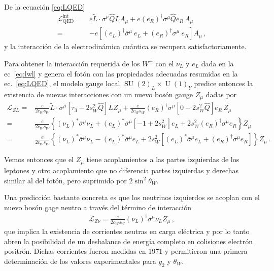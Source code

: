 \begin{frame}
De  la ecuación \eqref{eq:LQED}
\begin{align}
     \mathcal{L}^{\text{int}}_{\text{QED}}=&e \widetilde{L}\cdot\overline{\sigma}^\mu \widehat{Q} L A_\mu+
e \left( e_R \right)^{\dagger}{\sigma}^\mu \widehat{Q} e_R\, A_\mu \nonumber\\
=&-e \left[ \left( e_L \right)^{\dagger}\overline{\sigma}^\mu \ e_L + \left( e_R \right)^{\dagger}{\sigma}^\mu \ e_R  \right]A_{\mu}\,,
\end{align}
y la interacción de la electrodinámica cuántica se recupera satisfactoriamente.
\end{frame}

\begin{frame}
Para obtener la interacción requerida de los $W^{\pm}$ con el $\nu_L$ y $e_L$ dada en la ec~\eqref{eq:lwl} y genera el fotón con las propiedades adecuadas resumidas en la ec.~\eqref{eq:LQED}, el modelo gauge local $\operatorname{SU}(2)_L\times \operatorname{U}(1)_Y$ predice entonces la existencia de nuevas interacciones con un nuevo bosón gauge $Z_{\mu}$ dadas por
\begin{align}
  \label{eq:zneus}
\mathcal{L}_{ZL}
=&\frac{e}{2c_W s_W} \widetilde{L}\cdot\overline{\sigma}^\mu\left[ \tau_3-2s_W^2\widehat{Q}\right]L Z_\mu
+\frac{e}{2c_W s_W} \left( e_R \right)^{\dagger}{\sigma}^\mu\left[ 0-2s_W^2\widehat{Q}\right]e_R\, Z_\mu \nonumber\\
  =&\frac{e}{2c_W s_W} \left\{ \left( \nu_L \right)^{*}\overline{\sigma}^\mu \nu_L
    + \left( e_L \right)^{*}\overline{\sigma}^\mu\left[ -1+2s_W^2\right]e_L
     +2s_W^2 \left( e_R \right)^{\dagger}{\sigma}^\mu e_R 
     \right\}Z_\mu \nonumber\\
 =&\frac{e}{2c_W s_W} \left\{ \left( \nu_L \right)^{*}\overline{\sigma}^\mu \nu_L
    - \left( e_L \right)^{*}\overline{\sigma}^\mu e_L 
    +2s_W^2 \left[\left( e_L \right)^{*}\overline{\sigma}^\mu e_L+
    \left( e_R \right)^{\dagger}{\sigma}^\mu e_R    \right]  
     \right\}Z_\mu\,.     
\end{align}
\end{frame}
Vemos entonces que el $Z_{\mu}$ tiene acoplamientos a las partes izquierdas
de los leptones y otro acoplamiento que no diferencia partes izquierdas y derechas similar al del fotón, pero
suprimido por $2\sin^2\theta_W$.


Una predicción bastante concreta es que los neutrinos izquierdos se acoplan con el nuevo bosón gage neutro a través del término de interacción
\begin{align}
\mathcal{L}_{Z\nu}=  \frac{e}{2c_W s_W}\left( \nu_L \right)^{\dagger} \overline{\sigma}^{\mu} \nu_L Z_\mu\,,
\end{align}
que implica la existencia de corrientes neutras en carga eléctrica y por lo tanto abren la posibilidad de un desbalance de energía completo en colisiones electrón positrón. Dichas corrientes fueron medidas en 1971 y permitieron una primera determinación de los valores experimentales para $g_2$ y $\theta_W$.


